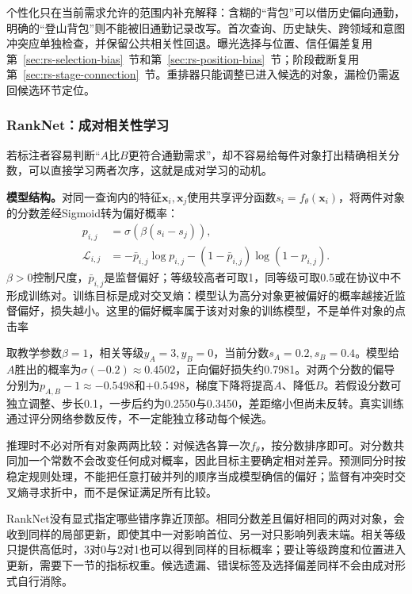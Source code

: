 个性化只在当前需求允许的范围内补充解释：含糊的“背包”可以借历史偏向通勤，明确的“登山背包”则不能被旧通勤记录改写。首次查询、历史缺失、跨领域和意图冲突应单独检查，并保留公共相关性回退。曝光选择与位置、信任偏差复用第~\ref{sec:rs-selection-bias}~节和第~\ref{sec:rs-position-bias}~节；阶段截断复用第~\ref{sec:rs-stage-connection}~节。重排器只能调整已进入候选的对象，漏检仍需返回候选环节定位。

\Needspace{100mm}
\subsubsection{RankNet：成对相关性学习}
\label{sec:rs-search-ranknet}

若标注者容易判断“$A$比$B$更符合通勤需求”，却不容易给每件对象打出精确相关分数，可以直接学习两者次序，这就是成对学习的动机。

\textbf{模型结构。}对同一查询内的特征$\bm x_i,\bm x_j$使用共享评分函数$s_i=f_\theta(\bm x_i)$，将两件对象的分数差经Sigmoid转为偏好概率：
\begin{equation}
 \begin{split}
 p_{i,j}&=\sigma(\beta(s_i-s_j)),\\
 \mathcal L_{i,j}&=-\bar p_{i,j}\log p_{i,j}
 -(1-\bar p_{i,j})\log(1-p_{i,j}).
 \end{split}
 \label{eq:rs-search-ranknet}
\end{equation}
$\beta>0$控制尺度，$\bar p_{i,j}$是监督偏好；等级较高者可取1，同等级可取0.5或在协议中不形成训练对。训练目标是成对交叉熵：模型认为高分对象更被偏好的概率越接近监督偏好，损失越小。这里的偏好概率属于该对对象的训练模型，不是单件对象的点击率

取教学参数$\beta=1$，相关等级$y_A=3,y_B=0$，当前分数$s_A=0.2,s_B=0.4$。模型给$A$胜出的概率为$\sigma(-0.2)\approx0.4502$，正向偏好损失约0.7981。对两个分数的偏导分别为$p_{A,B}-1\approx-0.5498$和$+0.5498$，梯度下降将提高$A$、降低$B$。若假设分数可独立调整、步长0.1，一步后约为0.2550与0.3450，差距缩小但尚未反转。真实训练通过评分网络参数反传，不一定能独立移动每个候选。

推理时不必对所有对象两两比较：对候选各算一次$f_\theta$，按分数排序即可。对分数共同加一个常数不会改变任何成对概率，因此目标主要确定相对差异。预测同分时按稳定规则处理，不能把任意打破并列的顺序当成模型确信的偏好；监督有冲突时交叉熵寻求折中，而不是保证满足所有比较。

RankNet没有显式指定哪些错序靠近顶部。相同分数差且偏好相同的两对对象，会收到同样的局部更新，即使其中一对影响首位、另一对只影响列表末端。相关等级只提供高低时，3对0与2对1也可以得到同样的目标概率；要让等级跨度和位置进入更新，需要下一节的指标权重。候选遗漏、错误标签及选择偏差同样不会由成对形式自行消除。

